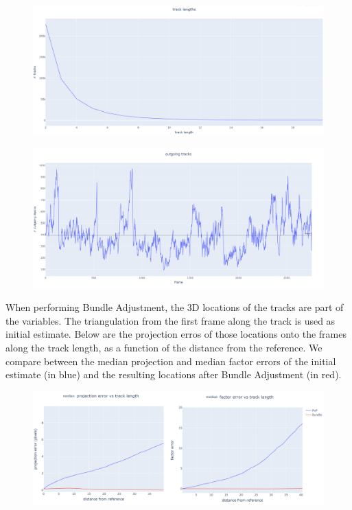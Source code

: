 \documentclass[12pt]{article}
\begin{document}
\newpage
\begin{figure}[H]
\includegraphics[width=\textwidth, height=0.25\textheight]{track lengths}
\end{figure}

\begin{figure}[H]
\includegraphics[width=\textwidth, height=0.25\textheight]{outgoing tracks}
\end{figure}

When performing Bundle Adjustment, the 3D locations of the tracks are part of the variables. The triangulation from the first frame along the track is used as initial estimate. Below are the projection erros of those locations onto the frames along the track length, as a function of the distance from the reference. We compare between the median projection and median factor errors of the initial estimate (in blue) and the resulting locations after Bundle Adjustment (in red).
\begin{figure}[H]
\includegraphics[width=\textwidth]{proj fact error}
\end{figure}
\end{document}
